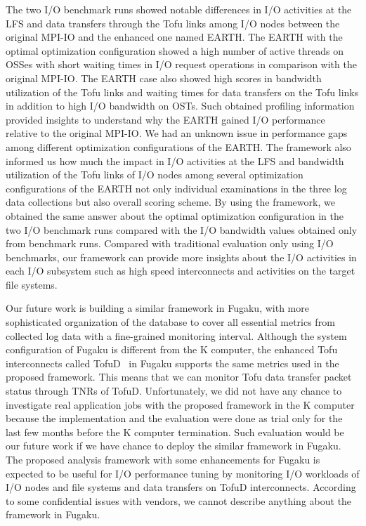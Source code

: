 \documentclass{jhps}
\begin{document}
The two I/O benchmark runs showed notable differences in I/O activities at the LFS
and data transfers through the Tofu links among I/O nodes between the original MPI-IO
and the enhanced one named EARTH.
The EARTH with the optimal optimization configuration showed a high number
of active threads on OSSes with short waiting times in I/O request operations
in comparison with the original MPI-IO.
The EARTH case also showed high scores in bandwidth utilization
of the Tofu links and waiting times for data transfers on the Tofu links
in addition to high I/O bandwidth on OSTs.
Such obtained profiling information provided insights to understand
why the EARTH gained I/O performance relative to the original MPI-IO.
We had an unknown issue in performance gaps among different optimization
configurations of the EARTH.
The framework also informed us how much the impact in I/O activities at the LFS
and bandwidth utilization of the Tofu links of I/O nodes
among several optimization configurations of the EARTH
not only individual examinations in the three log data collections
but also overall scoring scheme.
By using the framework, we obtained the same answer about the optimal
optimization configuration in the two I/O benchmark runs compared with
the I/O bandwidth values obtained only from benchmark runs.
Compared with traditional evaluation only using I/O benchmarks,
our framework can provide more insights about the I/O activities in each I/O subsystem
such as high speed interconnects and activities on the target file systems.

Our future work is building a similar framework in Fugaku,
with more sophisticated organization of the database to cover all essential metrics
from collected log data with a fine-grained monitoring interval.
Although the system configuration of Fugaku is different from the K computer,
the enhanced Tofu interconnects called TofuD~\cite{tofuD:cluster2018}
in Fugaku supports the same metrics used in the proposed framework.
This means that we can monitor Tofu data transfer packet status
through TNRs of TofuD.
Unfortunately, we did not have any chance to investigate real application jobs
with the proposed framework in the K computer because the implementation
and the evaluation were done as trial only for the last few months
before the K computer termination.
Such evaluation would be our future work if we have chance to deploy
the similar framework in Fugaku.
The proposed analysis framework with some enhancements for Fugaku
is expected to be useful for I/O performance tuning by monitoring I/O workloads
of I/O nodes and file systems and data transfers on TofuD interconnects.
According to some confidential issues with vendors,
we cannot describe anything about the framework in Fugaku.
\end{document}
